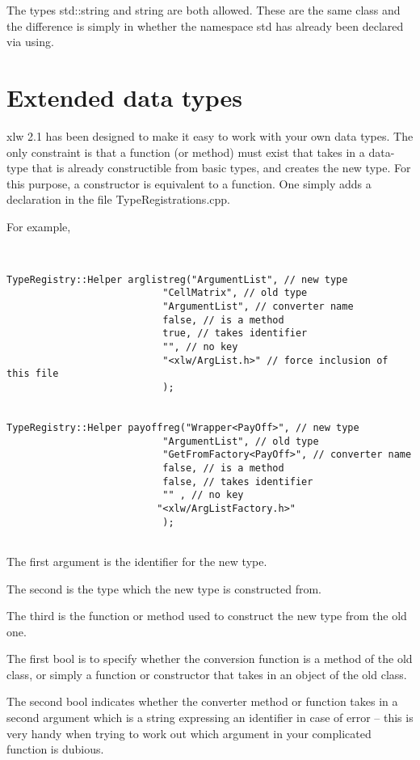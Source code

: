 \documentclass[12pt,reqno]{amsart}
\numberwithin{equation}{section}
\numberwithin{figure}{section}
\begin{document}
The types std::string and string are both allowed. These are the same
class and the difference is simply in whether the namespace std has
already been declared via using. 

\section{Extended data types}

xlw 2.1 has been designed to make it easy to work with your own data
types. The only constraint is that a function (or method) must exist
that takes in a data-type that is already constructible from basic
types, and creates the new type. For this purpose, a constructor is
equivalent to a function. One simply adds a declaration in the file
TypeRegistrations.cpp. 

For example,
\begin{verbatim}


TypeRegistry::Helper arglistreg("ArgumentList", // new type
                           "CellMatrix", // old type
                           "ArgumentList", // converter name
                           false, // is a method
                           true, // takes identifier 
                           "", // no key
                           "<xlw/ArgList.h>" // force inclusion of this file
                           );


TypeRegistry::Helper payoffreg("Wrapper<PayOff>", // new type
                           "ArgumentList", // old type
                           "GetFromFactory<PayOff>", // converter name
                           false, // is a method
                           false, // takes identifier 
                           "" , // no key
                          "<xlw/ArgListFactory.h>"
                           );


\end{verbatim}

The first argument is the identifier for the new type.

The second is the type which the new type is constructed from. 

The third is the function or method used to construct the new type
from the old one. 

The first bool is to specify whether the conversion function is a
method of the old class, or simply a function or constructor that
takes in an object of the old class. 

The second bool indicates whether the converter method or function
takes in a second argument which is a string expressing an identifier
in case of error -- this is very handy when trying to work out which
argument in your complicated function is dubious. 
\end{document}

